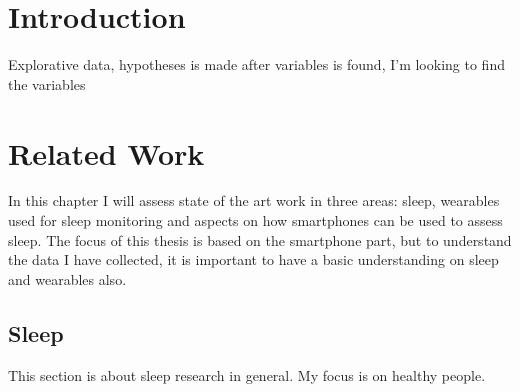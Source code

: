 \documentclass[12pt]{article} %
\begin{document}


\begin{abstract} 
  
\end{abstract}


\newpage
\tableofcontents

\newpage
\renewcommand{\abstractname}{Acknowledgements}
\begin{abstract}
\end{abstract}

\newpage  
\listoffigures
{} %

\listoftables
{} %

\newpage
\section{Introduction}
Explorative data, hypotheses is made after variables is found, I'm looking to find the variables 

\newpage
\section{Related Work}
In this chapter I will assess state of the art work in three areas: sleep, wearables used for sleep monitoring and aspects on how smartphones can be used to assess sleep. The focus of this thesis is based on the smartphone part, but to understand the data I have collected, it is important to have a basic understanding on sleep and wearables also. 

\subsection{Sleep}
This section is about sleep research in general. My focus is on healthy people. \\
\end{document}
